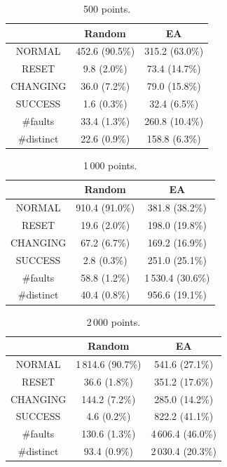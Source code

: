 \documentclass[times, utf8, diplomski]{fer}
\begin{document}
\begin{table}[!hbtp]
	\small
	\caption{500 points.}
	\label{tab:500}
	\centering
	\begin{tabular}{ccc}
		           &     Random     &       EA       \\ \toprule
		  NORMAL   & 452.6 (90.5\%) & 315.2 (63.0\%) \\
		  RESET    &  9.8 (2.0\%)   & 73.4 (14.7\%)  \\
		 CHANGING  &  36.0 (7.2\%)  & 79.0 (15.8\%)  \\
		 SUCCESS   &  1.6 (0.3\%)   &  32.4 (6.5\%)  \\ \midrule
		 \#faults  &  33.4 (1.3\%)  & 260.8 (10.4\%) \\
		\#distinct &  22.6 (0.9\%)  & 158.8 (6.3\%)  \\ \bottomrule
	\end{tabular}
\end{table}

\begin{table}
	\small
	\caption{1\,000 points.}
	\label{tab:1000}
	\centering
	\begin{tabular}{ccc}
		           &     Random     &        EA         \\ \toprule
		  NORMAL   & 910.4 (91.0\%) &  381.8 (38.2\%)   \\
		  RESET    &  19.6 (2.0\%)  &  198.0 (19.8\%)   \\
		 CHANGING  &  67.2 (6.7\%)  &  169.2 (16.9\%)   \\
		 SUCCESS   &  2.8 (0.3\%)   &  251.0 (25.1\%)   \\ \midrule
		 \#faults  &  58.8 (1.2\%)  & 1\,530.4 (30.6\%) \\
		\#distinct &  40.4 (0.8\%)  &  956.6 (19.1\%)   \\ \bottomrule
	\end{tabular}
\end{table}

\begin{table}
	\small
	\caption{2\,000 points.}
	\label{tab:2000}
	\centering
	\begin{tabular}{ccc}
		           &      Random       &        EA         \\ \toprule
		  NORMAL   & 1\,814.6 (90.7\%) &  541.6 (27.1\%)   \\
		  RESET    &   36.6 (1.8\%)    &  351.2 (17.6\%)   \\
		 CHANGING  &   144.2 (7.2\%)   &  285.0 (14.2\%)   \\
		 SUCCESS   &    4.6 (0.2\%)    &  822.2 (41.1\%)   \\ \midrule
		 \#faults  &   130.6 (1.3\%)   & 4\,606.4 (46.0\%) \\
		\#distinct &   93.4 (0.9\%)    & 2\,030.4 (20.3\%) \\ \bottomrule
	\end{tabular}
\end{table}
\end{document}
